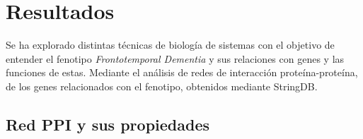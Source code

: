 
\section{Resultados}
Se ha explorado distintas técnicas de biología de sistemas con el objetivo de entender el fenotipo \textit{Frontotemporal Dementia} y sus relaciones con genes y las funciones de estas. 
Mediante el análisis de redes de interacción proteína-proteína, de los genes relacionados con el fenotipo, obtenidos mediante StringDB.

\subsection{Red PPI y sus propiedades}



